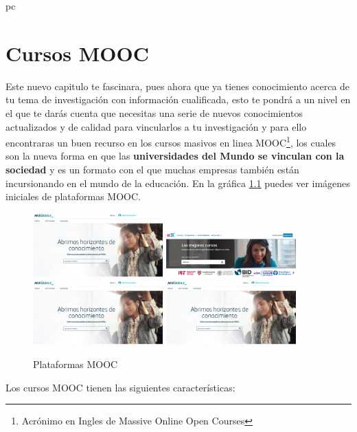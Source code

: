 pc\documentclass[a4paper,12pt,openany]{book}
\begin{document}
\chapter{Cursos MOOC}
 
Este nuevo capitulo te fascinara, pues ahora que ya tienes conocimiento acerca de tu tema de investigación con información cualificada, esto te pondrá a un nivel en el que te darás cuenta que necesitas una serie de nuevos conocimientos actualizados y de calidad para vincularlos a tu investigación y para ello encontraras un buen recurso en los cursos masivos en linea MOOC\footnote{Acrónimo en Ingles de Massive Online Open Courses}, los cuales son la nueva forma en que las \textbf{universidades del Mundo se vinculan con la sociedad} y es un formato con el que muchas empresas también están incursionando en el mundo de la educación. En la gráfica \ref{imagen:plataformas} puedes ver imágenes iniciales de plataformas MOOC. \

\begin{figure}[ht]
\includegraphics[width=5cm]{miriada1}
\includegraphics[width=5cm]{edx1}
\centering
\\
\includegraphics[width=5cm]{miriada1}
\includegraphics[width=5cm]{miriada1}
\centering
\caption{Plataformas MOOC}
\label{imagen:plataformas}
\end{figure}

Los cursos MOOC tienen las siguientes características:
\end{document}
